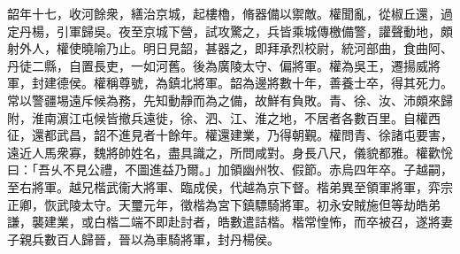 \begin{pinyinscope}
 
韶年十七，收河餘衆，繕治京城，起樓櫓，脩器備以禦敵。權聞亂，從椒丘還，過定丹楊，引軍歸吳。夜至京城下營，試攻驚之，兵皆乘城傳檄備警，讙聲動地，頗射外人，權使曉喻乃止。明日見韶，甚器之，即拜承烈校尉，統河部曲，食曲阿、丹徒二縣，自置長吏，一如河舊。後為廣陵太守、偏將軍。權為吳王，遷揚威將軍，封建德侯。權稱尊號，為鎮北將軍。韶為邊將數十年，善養士卒，得其死力。常以警疆埸遠斥候為務，先知動靜而為之備，故鮮有負敗。青、徐、汝、沛頗來歸附，淮南濵江屯候皆撤兵遠徙，徐、泗、江、淮之地，不居者各數百里。自權西征，還都武昌，韶不進見者十餘年。權還建業，乃得朝覲。權問青、徐諸屯要害，遠近人馬衆寡，魏將帥姓名，盡具識之，所問咸對。身長八尺，儀貌都雅。權歡恱曰：「吾乆不見公禮，不圖進益乃爾。」加領幽州牧、假節。赤烏四年卒。子越嗣，至右將軍。越兄楷武衞大將軍、臨成侯，代越為京下督。楷弟異至領軍將軍，弈宗正卿，恢武陵太守。天璽元年，徵楷為宮下鎮驃騎將軍。初永安賊施但等劫皓弟謙，襲建業，或白楷二端不即赴討者，皓數遣詰楷。楷常惶怖，而卒被召，遂將妻子親兵數百人歸晉，晉以為車騎將軍，封丹楊侯。
 
 
\end{pinyinscope}